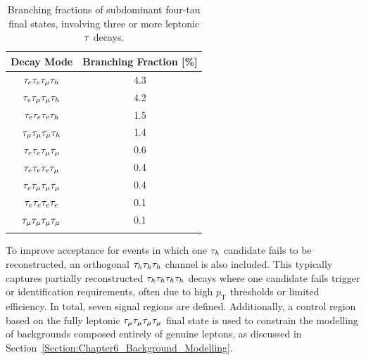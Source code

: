 \begin{table}[!htbp]
\centering
\renewcommand{\arraystretch}{1.5} %
\setlength{\tabcolsep}{12pt} %
\begin{tabular}{cc}
\hline
Decay Mode                  & Branching Fraction {[}\%{]} \\ \hline 
$\tau_e \tau_e \tau_{\mu} \tau_h$             & 4.3 \\ 
\arrayrulecolor{lightgray} \hline
$\tau_e \tau_{\mu} \tau_{\mu} \tau_h$                    & 4.2 \\ 
\arrayrulecolor{lightgray} \hline
$\tau_e \tau_e \tau_{e} \tau_h$                        & 1.5  \\ 
\arrayrulecolor{lightgray} \hline
$\tau_{\mu} \tau_{\mu} \tau_{\mu} \tau_h$                  & 1.4  \\ 
\arrayrulecolor{lightgray} \hline
$\tau_e \tau_e \tau_{\mu} \tau_{\mu}$             & 0.6  \\ 
\arrayrulecolor{lightgray} \hline
$\tau_e \tau_e \tau_{e} \tau_{\mu}$                     & 0.4  \\ 
\arrayrulecolor{lightgray} \hline
$\tau_e \tau_{\mu} \tau_{\mu} \tau_{\mu}$             & 0.4  \\ 
\arrayrulecolor{lightgray} \hline
$\tau_e \tau_e \tau_{e} \tau_e$                  & 0.1  \\ 
\arrayrulecolor{lightgray} \hline
$\tau_{\mu} \tau_{\mu} \tau_{\mu} \tau_{\mu}$                  & 0.1  \\ 
\arrayrulecolor{black} \hline
\end{tabular}
\caption[Branching fractions of subdominant four-tau decay modes]{Branching fractions of subdominant four-tau final states, involving three or more leptonic $\tau$ decays.}
\label{Table:Chapter6_4tau_decayModes_BF_Other}
\end{table}

To improve acceptance for events in which one $\tau_h$ candidate fails to be reconstructed, an orthogonal $\tau_h\tau_h\tau_h$ channel is also included. This typically captures partially reconstructed $\tau_h\tau_h\tau_h\tau_h$ decays where one candidate fails trigger or identification requirements, often due to high $p_\text{T}$ thresholds or limited efficiency. In total, seven signal regions are defined. Additionally, a control region based on the fully leptonic $\tau_{\mu} \tau_{\mu} \tau_{\mu} \tau_{\mu}$ final state is used to constrain the modelling of backgrounds composed entirely of genuine leptons, as discussed in Section~\ref{Section:Chapter6_Background_Modelling}.

